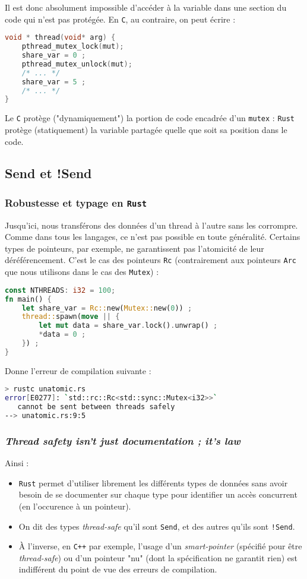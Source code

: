 \begin{frame}[fragile]
Il est donc absolument impossible d'accéder à la variable dans une section du
code qui n'est pas protégée. En \texttt{C}, au contraire, on peut écrire : 
\begin{lstlisting}[language=C]
void * thread(void* arg) {
    pthread_mutex_lock(mut);
    share_var = 0 ;
    pthread_mutex_unlock(mut);
    /* ... */
    share_var = 5 ;
    /* ... */
}
\end{lstlisting}
Le \texttt{C} protège ("dynamiquement") la portion de code encadrée d'un \texttt{mutex} : \texttt{Rust} protège (statiquement) la variable partagée quelle que soit sa position dans le code.
\end{frame}

\subsection{Send et !Send}
\begin{frame}[fragile]
  \frametitle{Robustesse et typage en \texttt{Rust}}
  Jusqu'ici, nous transférons des données d'un thread à l'autre sans les corrompre. Comme dans tous les langages, ce n'est pas possible en toute généralité. Certains types de pointeurs, par exemple, ne garantissent pas l'atomicité de leur déréférencement. C'est le cas des pointeurs \texttt{Rc} (contrairement aux pointeurs \texttt{Arc} que nous utilisons dans le cas des \texttt{Mutex}) :
  \begin{lstlisting}[language=rust, basicstyle=\small{}]
const NTHREADS: i32 = 100;
fn main() {
    let share_var = Rc::new(Mutex::new(0)) ;
    thread::spawn(move || {
        let mut data = share_var.lock().unwrap() ;
        *data = 0 ;
    }) ;
}
  \end{lstlisting}
\end{frame}
\begin{frame}[fragile]
Donne l'erreur de compilation suivante :
\begin{lstlisting}[language=bash]
> rustc unatomic.rs
error[E0277]: `std::rc::Rc<std::sync::Mutex<i32>>`
   cannot be sent between threads safely 
--> unatomic.rs:9:5
\end{lstlisting}
\end{frame}

\begin{frame}
  \frametitle{\textit{Thread safety isn't just documentation ; it's law}}
Ainsi : 
\begin{itemize}
\item  \texttt{Rust} permet d'utiliser librement les différents types de données sans avoir besoin de se documenter sur chaque type pour identifier un accès concurrent (en l'occurence à un pointeur).
\item  On dit des types \textit{thread-safe} qu'il sont \texttt{Send}, et des autres qu'ils sont \texttt{!Send}.
\item  À l'inverse, en \texttt{C++} par exemple, l'usage d'un \textit{smart-pointer} (spécifié pour être \textit{thread-safe}) ou d'un pointeur "nu" (dont la spécification ne garantit rien) est indifférent du point de vue des erreurs de compilation.
\end{itemize}
\end{frame}
